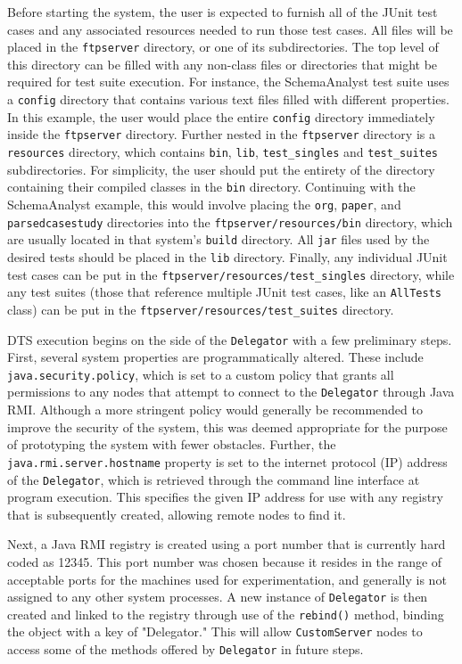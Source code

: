\documentclass{article}
\begin{document}
{Before starting the system, the user is expected to furnish all of the JUnit test cases and any associated resources needed to run those test cases.  All files will be placed in the \texttt{ftpserver} directory, or one of its subdirectories.  The top level of this directory can be filled with any non-class files or directories that might be required for test suite execution.  For instance, the SchemaAnalyst test suite uses a \texttt{config} directory that contains various text files filled with different properties.  In this example, the user would place the entire \texttt{config} directory immediately inside the \texttt{ftpserver} directory.  Further nested in the \texttt{ftpserver} directory is a \texttt{resources} directory, which contains  \texttt{bin}, \texttt{lib}, \texttt{test\_singles} and \texttt{test\_suites} subdirectories.  For simplicity, the user should put the entirety of the directory containing their compiled classes in the \texttt{bin} directory.  Continuing with the SchemaAnalyst example, this would involve placing the \texttt{org}, \texttt{paper}, and \texttt{parsedcasestudy} directories into the \texttt{ftpserver/resources/bin} directory, which are usually located in that system's \texttt{build} directory.  All \texttt{jar} files used by the desired tests should be placed in the \texttt{lib} directory.  Finally, any individual JUnit test cases can be put in the \texttt{ftpserver/resources/test\_singles} directory, while any test suites (those that reference multiple JUnit test cases, like an \texttt{AllTests} class) can be put in the \texttt{ftpserver/resources/test\_suites} directory.

DTS execution begins on the side of the \texttt{Delegator} with a few preliminary steps.  First, several system properties are programmatically altered. These include \texttt{java.security.policy}, which is set to a custom policy that grants all permissions to any nodes that attempt to connect to the \texttt{Delegator} through Java RMI.  Although a more stringent policy would generally be recommended to improve the security of the system, this was deemed appropriate for the purpose of prototyping the system with fewer obstacles.  Further, the \texttt{java.rmi.server.hostname} property is set to the internet protocol (IP) address of the \texttt{Delegator}, which is retrieved through the command line interface at program execution.  This specifies the given IP address for use with any registry that is subsequently created, allowing remote nodes to find it.

Next, a Java RMI registry is created using a port number that is currently hard coded as 12345.  This port number was chosen because it resides in the range of acceptable ports for the machines used for experimentation, and generally is not assigned to any other system processes.  A new instance of \texttt{Delegator} is then created and linked to the registry through use of the \texttt{rebind()} method, binding the object with a key of "Delegator."  This will allow \texttt{CustomServer} nodes to access some of the methods offered by \texttt{Delegator} in future steps.

}
\end{document}
